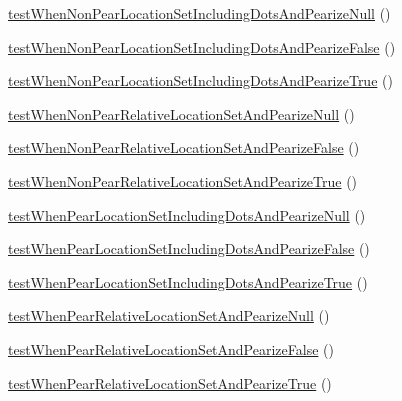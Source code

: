 \begin{DoxyCompactItemize}
\hyperlink{classtests___parser_class_get_source_location_tests_adc45c247191b61e54ae0c3130282eca2}{test\-When\-Non\-Pear\-Location\-Set\-Including\-Dots\-And\-Pearize\-Null} ()
\item 
\hyperlink{classtests___parser_class_get_source_location_tests_aa7f2e194ac6c3a48d4e3b99b9b22233f}{test\-When\-Non\-Pear\-Location\-Set\-Including\-Dots\-And\-Pearize\-False} ()
\item 
\hyperlink{classtests___parser_class_get_source_location_tests_a847f160fa013c177f1526beb60cf4f79}{test\-When\-Non\-Pear\-Location\-Set\-Including\-Dots\-And\-Pearize\-True} ()
\item 
\hyperlink{classtests___parser_class_get_source_location_tests_a0fd688d2f78f2e4f1e6713f9c273d846}{test\-When\-Non\-Pear\-Relative\-Location\-Set\-And\-Pearize\-Null} ()
\item 
\hyperlink{classtests___parser_class_get_source_location_tests_a062f7d0a5c7f617dc7a333feb9ebc583}{test\-When\-Non\-Pear\-Relative\-Location\-Set\-And\-Pearize\-False} ()
\item 
\hyperlink{classtests___parser_class_get_source_location_tests_a50ce479875ea0be03800dc0b6728ceb6}{test\-When\-Non\-Pear\-Relative\-Location\-Set\-And\-Pearize\-True} ()
\item 
\hyperlink{classtests___parser_class_get_source_location_tests_a97a31244f5f7d7e68028622f2b1f7e4f}{test\-When\-Pear\-Location\-Set\-Including\-Dots\-And\-Pearize\-Null} ()
\item 
\hyperlink{classtests___parser_class_get_source_location_tests_aa53958cf3d5fd242912b163f90953f6e}{test\-When\-Pear\-Location\-Set\-Including\-Dots\-And\-Pearize\-False} ()
\item 
\hyperlink{classtests___parser_class_get_source_location_tests_a98086ae5b2259b9d23ba9556b89123ad}{test\-When\-Pear\-Location\-Set\-Including\-Dots\-And\-Pearize\-True} ()
\item 
\hyperlink{classtests___parser_class_get_source_location_tests_abc271ab5c1f27e126ad4ee1facf43fc3}{test\-When\-Pear\-Relative\-Location\-Set\-And\-Pearize\-Null} ()
\item 
\hyperlink{classtests___parser_class_get_source_location_tests_affe812f239b0f76667c67d332a7b8a8a}{test\-When\-Pear\-Relative\-Location\-Set\-And\-Pearize\-False} ()
\item 
\hyperlink{classtests___parser_class_get_source_location_tests_a28d55f311e7315fe226c224f295b93ba}{test\-When\-Pear\-Relative\-Location\-Set\-And\-Pearize\-True} ()
\end{DoxyCompactItemize}
